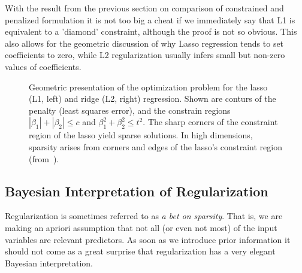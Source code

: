 \begin{refsection}
With the result from the previous section on comparison of constrained and penalized formulation it is not too big a cheat if we immediately say that L1 is equivalent to a 'diamond' constraint, although the proof is not so obvious. This also allows for the geometric discussion of why Lasso regression tends to set coefficients to zero, while L2 regularization usually infers small but non-zero values of coefficients.

\begin{figure}
\caption{Geometric presentation of the optimization problem for the lasso (L1, left) and ridge (L2, right) regression. Shown are conturs of the penalty (least squares error), and the constrain regions $|\beta_1|+|\beta_2|\leq c$ and $\beta_1^2+\beta_2^2\leq t^2$. The sharp corners of the constraint region of the lasso yield sparse solutions. In high dimensions, sparsity arises from corners and edges of the lasso's constraint region (from~\cite{Tibshirani2014}).}
\end{figure}


\subsection*{Bayesian Interpretation of Regularization}

Regularization is sometimes referred to as \emph{a bet on sparsity}. That is, we are making an apriori assumption that not all (or even not most) of the input variables are relevant predictors. As soon as we introduce prior information it should not come as a great surprise that regularization has a very elegant Bayesian interpretation.


\end{refsection}

